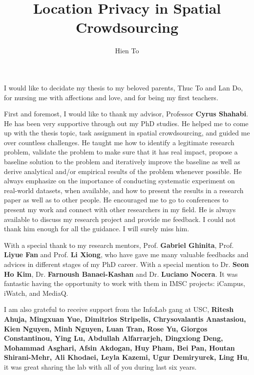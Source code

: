 \documentclass{USC-Thesis}
\title{Location Privacy in Spatial Crowdsourcing}
\author{Hien To}
\renewcommand\bf\bfseries
\numberwithin{equation}{chapter}
\begin{document}
\maketitle


\vspace*{\fill}
\begin{center}
{\Large
I would like to decidate my thesis to my beloved parents, Thuc To and Lan Do, for nursing me with affections and love, and for being my first teachers.}
\end{center}
\vspace*{\fill}



First and foremost, I would like to thank my advisor, Professor {\bf Cyrus Shahabi}. He has been very supportive through out my PhD studies. He helped me to come up with the thesis topic, task assignment in spatial crowdsourcing, and guided me over countless challenges. He taught me how to identify a legitimate research problem, validate the problem to make sure that it has real impact, propose a baseline solution to the problem and iteratively improve the baseline as well as derive analytical and/or empirical results of the problem whenever possible. He always emphasize on the importance of conducting systematic experiment on real-world datasets, when available, and how to present the results in a research paper as well as to other people. He encouraged me to go to conferences to present my work and connect with other researchers in my field. He is always available to discuss my research project and provide me feedback. I could not thank him enough for all the guidance. I will surely miss him.

With a special thank to my research mentors, Prof. \textbf{Gabriel Ghinita}, Prof. \textbf{Liyue Fan} and Prof. \textbf{Li Xiong}, who have gave me many valuable feedbacks and advices in different stages of my PhD career.
With a special mention to Dr. \textbf{Seon Ho Kim}, Dr. \textbf{Farnoush Banaei-Kashan} and Dr. \textbf{Luciano Nocera}. It was fantastic having the opportunity to work with them in IMSC projects: iCampus, iWatch, and MediaQ.

I am also grateful to receive support from the InfoLab gang at USC, {\bf Ritesh Ahuja, Mingxuan Yue, Dimitrios Stripelis, Chrysovalantis Anastasiou, Kien Nguyen, Minh Nguyen, Luan Tran, Rose Yu, Giorgos Constantinou, Ying Lu, Abdullah Alfarrarjeh, Dingxiong Deng, Mohammad Asghari, Afsin Akdogan, Huy Pham, Bei Pan, Houtan Shirani-Mehr, Ali Khodaei, Leyla Kazemi, Ugur Demiryurek, Ling Hu}, it was great sharing the lab with all of you during last six years.
\end{document}
